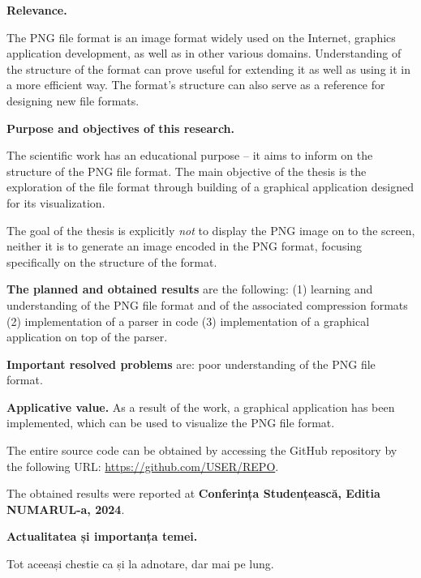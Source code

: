 \documentclass[a4paper,12pt]{report}
\renewcommand{\year}{2024}
\newcommand{\conferencesList}{Conferința Studențească, Editia NUMARUL-a, \year}
\newcommand{\github}{\url{https://github.com/USER/REPO}}
\begin{document}
\textbf{Relevance.}

The \acs{PNG} file format is an image format widely used on the Internet,
graphics application development, as well as in other various domains.
Understanding of the structure of the format can prove useful for extending it
as well as using it in a more efficient way.
The format's structure can also serve as a reference for designing new file formats.

\textbf{Purpose and objectives of this research.}

The scientific work has an educational purpose
-- it aims to inform on the structure of the \acs{PNG} file format.
The main objective of the thesis is the exploration of the file format
through building of a graphical application designed for its visualization.

The goal of the thesis is explicitly \textit{not} to display the \acs{PNG} image on to the screen,
neither it is to generate an image encoded in the \acs{PNG} format, focusing specifically
on the structure of the format.

\textbf{The planned and obtained results} are the following:
(1) learning and understanding of the \acs{PNG} file format and of the associated compression formats
(2) implementation of a parser in code
(3) implementation of a graphical application on top of the parser.

\textbf{Important resolved problems} are: poor understanding of the \acs{PNG} file format.

\textbf{Applicative value.} 
As a result of the work, a graphical application has been implemented,
which can be used to visualize the \acs{PNG} file format.

The entire source code can be obtained by accessing the GitHub repository
by the following URL: \github. 

The obtained results were reported at \textbf{\conferencesList}\cite{self}.

\clearpage
{}
\begin{acronym}[JPEG]
\end{acronym}

\introChapter

\textbf{Actualitatea și importanța temei.}

Tot aceeași chestie ca și la adnotare, dar mai pe lung.
\end{document}
